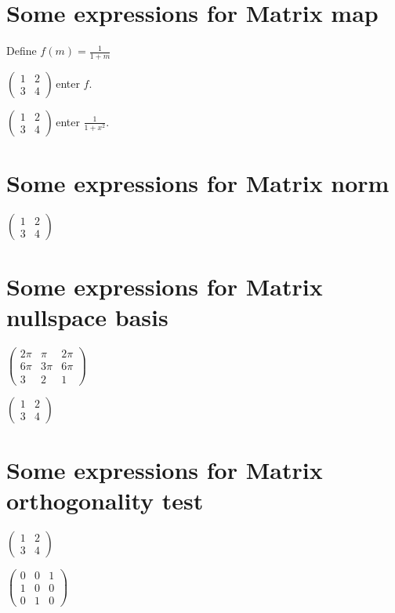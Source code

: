 \documentclass{article}
\begin{document}
\section{Some expressions for Matrix map}

Define $f\left( m\right) =\frac{1}{1+m}$

$\left( 
\begin{array}{cc}
1 & 2 \\ 
3 & 4%
\end{array}%
\right) \,$enter $f$.

$\left( 
\begin{array}{cc}
1 & 2 \\ 
3 & 4%
\end{array}%
\right) \,$enter $\frac{1}{1+x^{2}}$.

\section{Some expressions for Matrix norm}

$\left( 
\begin{array}{cc}
1 & 2 \\ 
3 & 4%
\end{array}%
\right) $

\section{Some expressions for Matrix nullspace basis}

$\left( 
\begin{array}{ccc}
2\pi & \pi & 2\pi \\ 
6\pi & 3\pi & 6\pi \\ 
3 & 2 & 1%
\end{array}%
\right) $

$\left( 
\begin{array}{cc}
1 & 2 \\ 
3 & 4%
\end{array}%
\right) $

\section{Some expressions for Matrix orthogonality test}

$\left( 
\begin{array}{cc}
1 & 2 \\ 
3 & 4%
\end{array}%
\right) $

$\left( 
\begin{array}{crr}
0 & 0 & 1 \\ 
1 & 0 & 0 \\ 
0 & 1 & 0%
\end{array}%
\right) $
\end{document}
